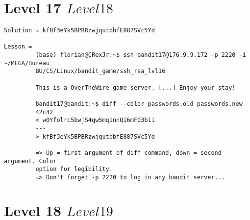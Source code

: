 \documentclass[a4paper]{report}
\begin{document}
\section{Level 17 \rightarrow $ Level 18 $}

\begin{verbatim}
Solution = kfBf3eYk5BPBRzwjqutbbfE887SVc5Yd

Lesson = 
		 (base) florian@CRexJr:~$ ssh bandit17@176.9.9.172 -p 2220 -i ~/MEGA/Bureau
		 BU/CS/Linux/bandit_game/ssh_rsa_lvl16
		 
		 This is a OverTheWire game server. [...] Enjoy your stay!
		 
		 bandit17@bandit:~$ diff --color passwords.old passwords.new
		 42c42
		 < w0Yfolrc5bwjS4qw5mq1nnQi6mF03bii
		 ---
		 > kfBf3eYk5BPBRzwjqutbbfE887SVc5Yd
		 
		 => Up = first argument of diff command, down = second argument. Color
		 option for legibility.
		 => Don't forget -p 2220 to log in any bandit server...
\end{verbatim}


\section{Level 18 \rightarrow $ Level 19 $}
\end{document}
